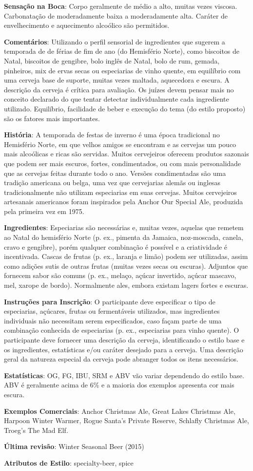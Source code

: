 \textbf{Sensação na Boca}: Corpo geralmente de médio a alto, muitas vezes viscosa. Carbonatação de moderadamente baixa a moderadamente alta. Caráter de envelhecimento e aquecimento alcoólico são permitidos.

\textbf{Comentários}: Utilizando o perfil sensorial de ingredientes que sugerem a temporada de de férias de fim de ano (do Hemisfério Norte), como biscoitos de Natal, biscoitos de gengibre, bolo inglês de Natal, bolo de rum, gemada, pinheiros, mix de ervas secas ou especiarias de vinho quente, em equilíbrio com uma cerveja base de suporte, muitas vezes maltada, aquecedora e escura. A descrição da cerveja é crítica para avaliação. Os juízes devem pensar mais no conceito declarado do que tentar detectar individualmente cada ingrediente utilizado. Equilíbrio, facilidade de beber e execução do tema (do estilo proposto) são os fatores mais importantes.

\textbf{História}: A temporada de festas de inverno é uma época tradicional no Hemisfério Norte, em que velhos amigos se encontram e as cervejas um pouco mais alcoólicas e ricas são servidas. Muitos cervejeiros oferecem produtos sazonais que podem ser mais escuros, fortes, condimentados, ou com mais personalidade que as cervejas feitas durante todo o ano. Versões condimentadas são uma tradição americana ou belga, uma vez que cervejarias alemãs ou inglesas tradicionalmente não utilizam especiarias em suas cervejas. Muitos cervejeiros artesanais americanos foram inspirados pela Anchor Our Special Ale, produzida pela primeira vez em 1975.

\textbf{Ingredientes}: Especiarias são necessárias e, muitas vezes, aquelas que remetem ao Natal do hemisfério Norte (p. ex., pimenta da Jamaica, noz-moscada, canela, cravo e gengibre), porém qualquer combinação é possível e a criatividade é incentivada. Cascas de frutas (p. ex., laranja e limão) podem ser utilizadas, assim como adições sutis de outras frutas (muitas vezes secas ou escuras). Adjuntos que fornecem sabor são comuns (p. ex., melaço, açúcar invertido, açúcar mascavo, mel, xarope de bordo). Normalmente ales, embora existam lagers fortes e escuras.

\textbf{Instruções para Inscrição}: O participante deve especificar o tipo de especiarias, açúcares, frutas ou fermentáveis utilizados, mas ingredientes individuais não necessitam serem especificados, caso façam parte de uma combinação conhecida de especiarias (p. ex., especiarias para vinho quente). O participante deve fornecer uma descrição da cerveja, identificando o estilo base e os ingredientes, estatísticas e/ou caráter desejado para a cerveja. Uma descrição geral da natureza especial da cerveja pode abranger todos os itens necessários.

\textbf{Estatísticas}: OG, FG, IBU, SRM e ABV vão variar dependendo do estilo base. ABV é geralmente acima de 6\% e a maioria dos exemplos apresenta cor mais escura.

\textbf{Exemplos Comerciais}: Anchor Christmas Ale, Great Lakes Christmas Ale, Harpoon Winter Warmer, Rogue Santa's Private Reserve, Schlafly Christmas Ale, Troeg's The Mad Elf.

\textbf{Última revisão}: Winter Seasonal Beer (2015)

\textbf{Atributos de Estilo}: specialty-beer, spice
